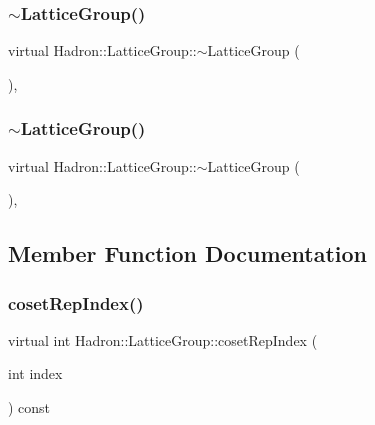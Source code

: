 \subsubsection{\texorpdfstring{$\sim$LatticeGroup()}{~LatticeGroup()}\hspace{0.1cm}{\footnotesize\ttfamily [1/2]}}
{\footnotesize\ttfamily virtual Hadron\+::\+Lattice\+Group\+::$\sim$\+Lattice\+Group (\begin{DoxyParamCaption}{ }\end{DoxyParamCaption})\hspace{0.3cm}{\ttfamily [inline]}, {\ttfamily [virtual]}}

\mbox{\label{structHadron_1_1LatticeGroup_a8265941ad6e64b658d2eb904e7d85d62}} 
\subsubsection{\texorpdfstring{$\sim$LatticeGroup()}{~LatticeGroup()}\hspace{0.1cm}{\footnotesize\ttfamily [2/2]}}
{\footnotesize\ttfamily virtual Hadron\+::\+Lattice\+Group\+::$\sim$\+Lattice\+Group (\begin{DoxyParamCaption}{ }\end{DoxyParamCaption})\hspace{0.3cm}{\ttfamily [inline]}, {\ttfamily [virtual]}}



\subsection{Member Function Documentation}
\mbox{\label{structHadron_1_1LatticeGroup_a7e3b9b5e2f596e6c40d64aa939a3ad6c}} 
\subsubsection{\texorpdfstring{cosetRepIndex()}{cosetRepIndex()}\hspace{0.1cm}{\footnotesize\ttfamily [1/2]}}
{\footnotesize\ttfamily virtual int Hadron\+::\+Lattice\+Group\+::coset\+Rep\+Index (\begin{DoxyParamCaption}\item[{int}]{index }\end{DoxyParamCaption}) const\hspace{0.3cm}{\ttfamily [pure virtual]}}

